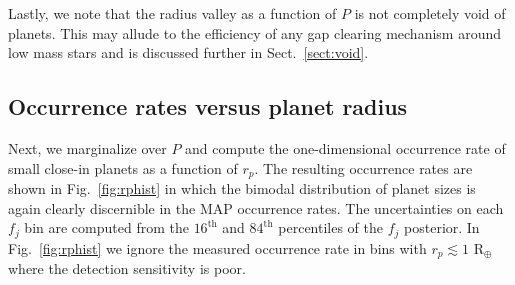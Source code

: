 \documentclass[twocolumn]{emulateapj}
\begin{document}


Lastly, we note that the radius valley as a function of $P$ is not completely void of planets.
This may allude to the efficiency of any gap clearing mechanism around low mass stars and is
discussed further in Sect.~\ref{sect:void}.

\subsection{Occurrence rates versus planet radius}
Next, we marginalize over $P$ and compute the one-dimensional occurrence rate of small close-in planets
as a function of $r_p$. The resulting occurrence rates are shown in Fig.~\ref{fig:rphist} in which the bimodal
distribution of planet sizes is again clearly discernible in the MAP occurrence rates.
The uncertainties on each $f_j$ bin are computed from the $16^{\text{th}}$ and $84^{\text{th}}$ percentiles
of the $f_j$ posterior. In Fig.~\ref{fig:rphist} we ignore the measured occurrence rate in bins with
$r_p\lesssim 1$ R$_{\oplus}$ where the detection sensitivity is poor.
\end{document}

